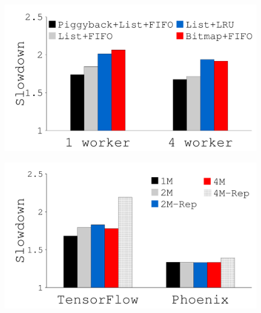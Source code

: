 {\begin{figure}[th]
\begin{minipage}{0.50\columnwidth}
\begin{center}
{}
\end{center}
\end{minipage}
\begin{minipage}{0.50\columnwidth}
\begin{center}
\centerline{\includegraphics[width=1.0\columnwidth]{Figures/g_plot_LEGO_excache_tech.pdf}}
\vspace{-0.06in}
{
}
\end{center}
\end{minipage}
\begin{minipage}{0.50\columnwidth}
\begin{center}
\centerline{\includegraphics[width=1.0\columnwidth]{Figures/g_plot_LEGO_number_memory_rep.pdf}}
\vspace{-0.06in}
{
}
\end{center}
\end{minipage}
\vspace{-0.1in}
\end{figure}
}
